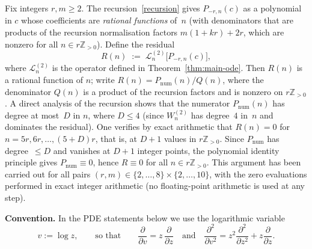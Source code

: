 \documentclass[final,nopreprintline]{elsarticle}
\theoremstyle{definition}
\numberwithin{equation}{section}
\theoremstyle{remark}
\begin{document}
Fix integers $r,m\ge2$.
The recursion~\eqref{recursion} gives $P_{-r,n}(c)$ as a polynomial in $c$ whose
coefficients are \emph{rational functions} of~$n$ (with denominators that are products
of the recursion normalisation factors $m(1+kr)+2r$, which are nonzero for all
$n\in r\mathbb{Z}_{>0}$).
Define the residual
\begin{equation}\label{eq:residual-def}
R(n) \;:=\; \mathcal{L}^{(2)}_n\bigl[P_{-r,n}(c)\bigr],
\end{equation}
where $\mathcal{L}^{(2)}_n$ is the operator defined in Theorem~\ref{thm:main-ode}.
Then $R(n)$ is a rational function of $n$; write $R(n) = P_{\mathrm{num}}(n)/Q(n)$,
where the denominator $Q(n)$ is a product of the recursion factors and is nonzero on
$r\mathbb{Z}_{>0}$.
A direct analysis of the recursion shows that the numerator $P_{\mathrm{num}}(n)$
has degree at most~$D$ in $n$, where $D\le 4$ (since $W^{(2)}_n$ has degree~$4$ in~$n$ and
dominates the residual).
One verifies by exact arithmetic that $R(n)=0$ for $n=5r,6r,\ldots,(5+D)r$,
that is, at $D+1$ values in $r\mathbb{Z}_{>0}$.
Since $P_{\mathrm{num}}$ has degree~$\le D$ and vanishes at $D+1$ integer points,
the polynomial identity principle gives $P_{\mathrm{num}}\equiv 0$, hence $R\equiv 0$
for all $n\in r\mathbb{Z}_{>0}$.
This argument has been carried out for all pairs
$(r,m)\in\{2,\ldots,8\}\times\{2,\ldots,10\}$,
with the zero evaluations performed in exact integer arithmetic
(no floating-point arithmetic is used at any step).

\medskip
\noindent\textbf{Convention.}
In the PDE statements below we use the logarithmic variable
\[
v:=\log z,
\qquad\text{so that}\qquad
\frac{\partial}{\partial v}=z\,\frac{\partial}{\partial z}
\quad\text{and}\quad
\frac{\partial^2}{\partial v^2}=z^2\frac{\partial^2}{\partial z^2}+z\frac{\partial}{\partial z}.
\]
\end{document}
